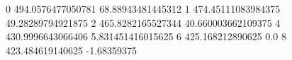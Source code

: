 0 494.0576477050781 68.88943481445312
1 474.45111083984375 49.28289794921875
2 465.8282165527344 40.660003662109375
4 430.9996643066406 5.831451416015625
6 425.168212890625 0.0
8 423.484619140625 -1.68359375
